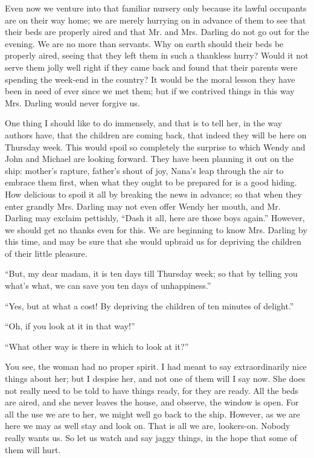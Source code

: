 Even now we venture into that familiar nursery only because its lawful
occupants are on their way home; we are merely hurrying on in advance
of them to see that their beds are properly aired and that Mr. and Mrs.
Darling do not go out for the evening. We are no more than servants.
Why on earth should their beds be properly aired, seeing that they left
them in such a thankless hurry? Would it not serve them jolly well
right if they came back and found that their parents were spending the
week-end in the country? It would be the moral lesson they have been in
need of ever since we met them; but if we contrived things in this way
Mrs. Darling would never forgive us.

One thing I should like to do immensely, and that is to tell her, in
the way authors have, that the children are coming back, that indeed
they will be here on Thursday week. This would spoil so completely the
surprise to which Wendy and John and Michael are looking forward. They
have been planning it out on the ship: mother's rapture, father's shout
of joy, Nana's leap through the air to embrace them first, when what
they ought to be prepared for is a good hiding. How delicious to spoil
it all by breaking the news in advance; so that when they enter grandly
Mrs. Darling may not even offer Wendy her mouth, and Mr. Darling may
exclaim pettishly, ``Dash it all, here are those boys again.'' However,
we should get no thanks even for this. We are beginning to know Mrs.
Darling by this time, and may be sure that she would upbraid us for
depriving the children of their little pleasure.

``But, my dear madam, it is ten days till Thursday week; so that by
telling you what's what, we can save you ten days of unhappiness.''

``Yes, but at what a cost! By depriving the children of ten minutes of
delight.''

``Oh, if you look at it in that way!''

``What other way is there in which to look at it?''

You see, the woman had no proper spirit. I had meant to say
extraordinarily nice things about her; but I despise her, and not one
of them will I say now. She does not really need to be told to have
things ready, for they are ready. All the beds are aired, and she never
leaves the house, and observe, the window is open. For all the use we
are to her, we might well go back to the ship. However, as we are here
we may as well stay and look on. That is all we are, lookers-on. Nobody
really wants us. So let us watch and say jaggy things, in the hope that
some of them will hurt.

